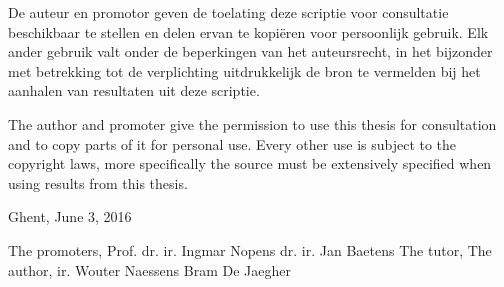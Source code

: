 

\rule[-0.4\baselineskip]{0cm}{14\baselineskip}   
\par \vspace{2.9ex plus 0.3ex minus 0.3ex}
De auteur en promotor geven de toelating deze scriptie voor consultatie beschikbaar te stellen en delen ervan te kopi\"eren voor persoonlijk gebruik. Elk ander gebruik valt onder de beperkingen van het auteursrecht, in het bijzonder met betrekking tot de verplichting uitdrukkelijk de bron te vermelden bij het aanhalen van resultaten uit deze scriptie.
\par \vspace{2.3ex plus 0.3ex minus 0.3ex}
The author and promoter give the permission to use this thesis for consultation and to copy parts of it for personal use. Every other use is subject to the copyright laws, more specifically the source must be extensively specified when using results from this thesis.
\par \vspace{2.3ex plus 0.3ex minus 0.3ex}
Ghent, June 3, 2016 %
\par \vspace{2.3ex plus 0.3ex minus 0.3ex}

The promoters, 
\npar
\vspace{2cm}
\npar
Prof. dr. ir. Ingmar Nopens \hfill dr. ir. Jan Baetens 
\npar
\vspace{0cm}
\npar
The tutor, \hfill The author,
\npar
\vspace{2cm}
\npar
ir. Wouter Naessens \hfill Bram De Jaegher

\thispagestyle{empty} 

